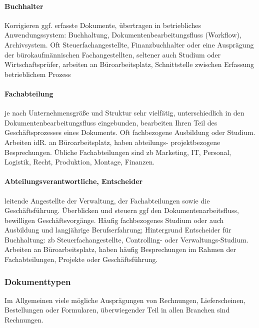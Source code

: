 \documentclass[11pt,oneside,a4paper,notitlepage]{article}
\begin{document}
%
\paragraph*{Buchhalter}
Korrigieren ggf. erfasste Dokumente, übertragen in betriebliches Anwendungssystem: Buchhaltung, Dokumentenbearbeitungsfluss (Workflow), Archivsystem. Oft Steuerfachangestellte, Finanzbuchhalter oder eine Ausprägung der bürokaufmännischen Fachangestellten, seltener auch Studium oder Wirtschaftsprüfer, arbeiten an Büroarbeitsplatz, Schnittstelle zwischen Erfassung betrieblichem Prozess

%
\paragraph*{Fachabteilung}
je nach Unternehmensgröße und Struktur sehr vielfätig, unterschiedlich in den Dokumentenbearbeitungsfluss eingebunden, bearbeiten Ihren Teil des Geschäftsprozesses eines Dokuments. Oft fachbezogene Ausbildung oder Studium. Arbeiten idR. an Büroarbeitsplatz, haben abteilungs- projektbezogene Besprechungen. Übliche Fachabteilungen sind zb Marketing, IT, Personal, Logistik, Recht, Produktion, Montage, Finanzen.

%
\paragraph*{Abteilungsverantwortliche, Entscheider}
leitende Angestellte der Verwaltung, der Fachabteilungen sowie die Geschäftsführung. Überblicken und steuern ggf den Dokumentenarbeitsfluss, bewilligen Geschäftsvorgänge. Häufig fachbezogenes Studium oder auch Ausbildung und langjährige Berufserfahrung; Hintergrund Entscheider für Buchhaltung: zb Steuerfachangestellte, Controlling- oder Verwaltungs-Studium. Arbeiten an Büroarbeitsplatz, haben häufig Besprechungen im Rahmen der Fachabteilungen, Projekte oder Geschäftsführung.


\subsubsection{Dokumenttypen}
Im Allgemeinen viele mögliche Ausprägungen von Rechnungen, Lieferscheinen, Bestellungen oder Formularen, überwiegender Teil in allen Branchen sind Rechnungen.




%
\end{document}
